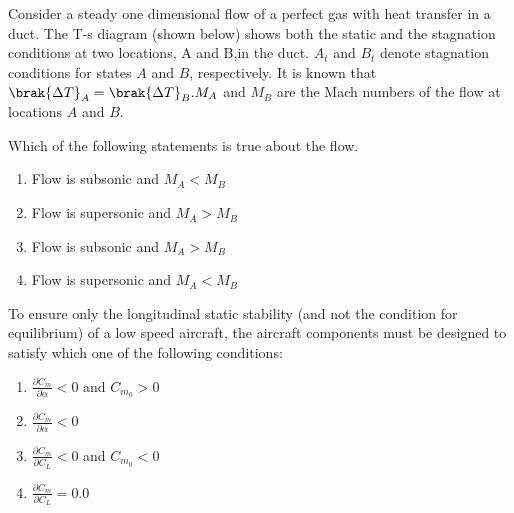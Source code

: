\item Consider a steady one dimensional flow of a perfect gas with heat transfer in a duct. The T-s diagram (shown below) shows both the static and the stagnation conditions at two locations, A and B,in the duct. $A_t$ and $B_t$ denote stagnation conditions for states $A$ and $B$, respectively. It is known that $\brak{\Delta T}_A=\brak{\Delta T}_B. M_A$ and $M_B$ are the Mach numbers of the flow at locations $A$ and $B$.\\
	\begin{center}
\end{center}
Which of the following statements is true about the flow.
\begin{enumerate}
	\item Flow is subsonic and $M_A<M_B$
	\item Flow is supersonic and $M_A>M_B$
	\item Flow is subsonic and $M_A>M_B$
	\item Flow is supersonic and $M_A<M_B$
\end{enumerate}

\item To ensure only the longitudinal static stability (and not the condition for equilibrium) of a low speed aircraft, the aircraft components must be designed to satisfy which one of the following conditions:
	\begin{enumerate}
		\item $\frac{\partial C_m}{\partial \alpha}<0$ and $C_{m_0}>0$
		\item $\frac{\partial C_m}{\partial \alpha}<0$ 
		\item $\frac{\partial C_m}{\partial {C_L}}<0$ and $C_{m_0}<0$
		\item $\frac{\partial C_m}{\partial {C_L}}=0.0$
	\end{enumerate}

